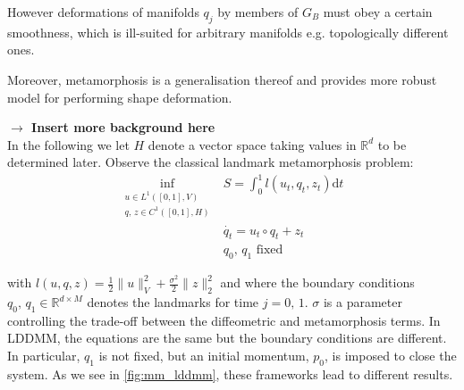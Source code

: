 \documentclass{article}
\newcommand{\half}{\frac 12}
\newcommand{\norm}[2]{\| #1 \|_{ #2 }}
\newcommand{\vnorm}[1]{\norm{ #1 }{V}}
\newcommand{\ltwonorm}[1]{\norm{ #1 }{2}}
\newcommand{\diff}[1]{\text{d} #1}
\newcommand{\Rd}{\mathbb{R}^{d}}
\newcommand{\RdM}{\mathbb{R}^{d\times M}}
\begin{document}
However deformations of manifolds $q_j$ by members of $G_B$ must obey a certain
smoothness, which is ill-suited for arbitrary manifolds e.g. topologically
different ones.

Moreover, metamorphosis is a generalisation thereof and provides more robust
model for performing shape deformation.

\textbf{$\longrightarrow$ Insert more background here}\\

In the following we let $H$ denote a vector space taking values in $\Rd$ to be determined later.
Observe the classical landmark metamorphosis problem:
\begin{subequations}
\begin{align}
\inf_{\substack{u\in L^1([0,1],V)\\q,\, z \in C^1([0,1], H)}} & S = \int_0^1
l(u_t, q_t, z_t)\diff{t}\\
    & \dot{q_t} = u_t \circ q_t + z_t \\
    & q_0,\,q_1\text{ fixed}
\end{align}
\end{subequations}

with $l(u, q, z) = \half \vnorm{u}^2 + \frac{\sigma^2}2 \ltwonorm{z}^2$ and
where the boundary conditions $q_0,\,q_1 \in \RdM$ denotes the landmarks for
time $j=0,\,1$.  $\sigma$ is a parameter controlling the trade-off between the
diffeometric and metamorphosis terms. In LDDMM, the equations are the same but
the boundary conditions are different.  In particular, $q_1$ is not fixed, but
an initial momentum, $p_0$, is imposed to close the system. As we see in
\ref{fig:mm_lddmm}, these frameworks lead to different results.
\end{document}

